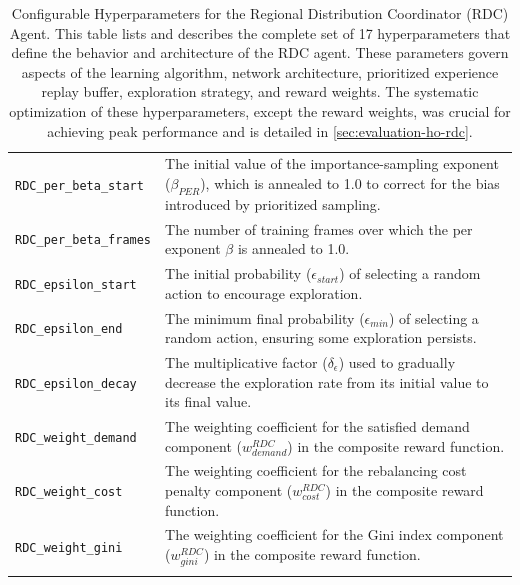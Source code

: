 \begin{xltabular}{\textwidth}{lX}
        \texttt{RDC\_per\_beta\_start}      & The initial value of the importance-sampling exponent ($\beta_{PER}$), which is annealed to 1.0 to correct for the bias introduced by prioritized sampling. \\
        \texttt{RDC\_per\_beta\_frames}     & The number of training frames over which the \gls{per} exponent $\beta$ is annealed to 1.0. \\
        \midrule
        \texttt{RDC\_epsilon\_start}        & The initial probability ($\epsilon_{start}$) of selecting a random action to encourage exploration. \\
        \texttt{RDC\_epsilon\_end}          & The minimum final probability ($\epsilon_{min}$) of selecting a random action, ensuring some exploration persists. \\
        \texttt{RDC\_epsilon\_decay}        & The multiplicative factor ($\delta_{\epsilon}$) used to gradually decrease the exploration rate from its initial value to its final value. \\
        \midrule
        \texttt{RDC\_weight\_demand}        & The weighting coefficient for the satisfied demand component ($w_{demand}^{RDC}$) in the composite reward function. \\
        \texttt{RDC\_weight\_cost}          & The weighting coefficient for the rebalancing cost penalty component ($w_{cost}^{RDC}$) in the composite reward function. \\
        \texttt{RDC\_weight\_gini}          & The weighting coefficient for the Gini index component ($w_{gini}^{RDC}$) in the composite reward function. \\
        \bottomrule
    \caption{Configurable Hyperparameters for the Regional Distribution Coordinator (RDC) Agent. This table lists and describes the complete set of 17 hyperparameters that define the behavior and architecture of the RDC agent. These parameters govern aspects of the learning algorithm, network architecture, prioritized experience replay buffer, exploration strategy, and reward weights. The systematic optimization of these hyperparameters, except the reward weights, was crucial for achieving peak performance and is detailed in \autoref{sec:evaluation-ho-rdc}.}
    \label{tab:rdc_hyperparameters_detailed}
\end{xltabular}

